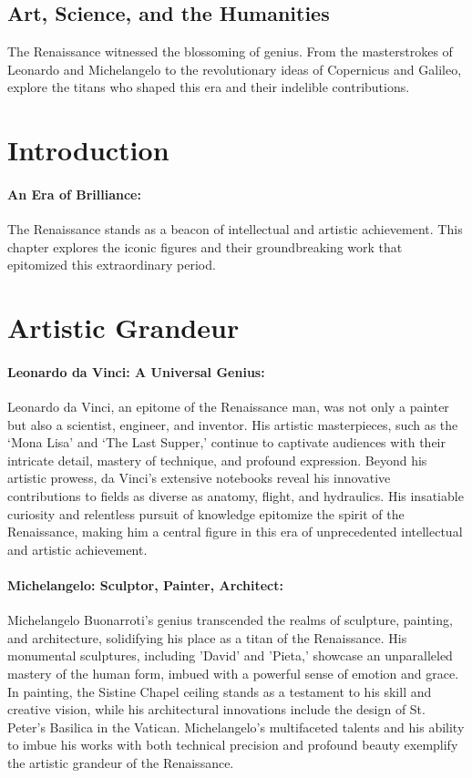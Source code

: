 \documentclass[a4paper,12pt]{book}
\begin{document}
\subsection*{Art, Science, and the Humanities}
The Renaissance witnessed the blossoming of genius. From the masterstrokes of Leonardo and Michelangelo to the revolutionary ideas of Copernicus and Galileo, explore the titans who shaped this era and their indelible contributions.

\section*{Introduction}

\paragraph{An Era of Brilliance:}
The Renaissance stands as a beacon of intellectual and artistic achievement. This chapter explores the iconic figures and their groundbreaking work that epitomized this extraordinary period.

\section*{Artistic Grandeur}

\paragraph{Leonardo da Vinci: A Universal Genius:}
Leonardo da Vinci, an epitome of the Renaissance man, was not only a painter but also a scientist, engineer, and inventor. His artistic masterpieces, such as the ‘Mona Lisa’ and ‘The Last Supper,’ continue to captivate audiences with their intricate detail, mastery of technique, and profound expression. Beyond his artistic prowess, da Vinci's extensive notebooks reveal his innovative contributions to fields as diverse as anatomy, flight, and hydraulics. His insatiable curiosity and relentless pursuit of knowledge epitomize the spirit of the Renaissance, making him a central figure in this era of unprecedented intellectual and artistic achievement.

\paragraph{Michelangelo: Sculptor, Painter, Architect:}
Michelangelo Buonarroti’s genius transcended the realms of sculpture, painting, and architecture, solidifying his place as a titan of the Renaissance. His monumental sculptures, including 'David' and 'Pieta,' showcase an unparalleled mastery of the human form, imbued with a powerful sense of emotion and grace. In painting, the Sistine Chapel ceiling stands as a testament to his skill and creative vision, while his architectural innovations include the design of St. Peter’s Basilica in the Vatican. Michelangelo's multifaceted talents and his ability to imbue his works with both technical precision and profound beauty exemplify the artistic grandeur of the Renaissance.
\end{document}
